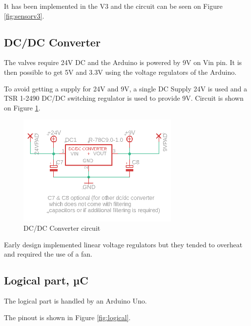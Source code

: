\documentclass[a4paper]{article}
\begin{document}
It has been implemented in the V3 and the circuit can be seen on Figure \ref{fig:sensorv3}.

\subsection{DC/DC Converter}
The valves require 24V DC and the Arduino is powered by 9V on Vin pin. It is then possible to get 5V and 3.3V using the voltage regulators of the Arduino.

To avoid getting a supply for 24V and 9V, a single DC Supply 24V is used and a TSR 1-2490 DC/DC switching regulator is used to provide 9V.
Circuit is shown on Figure \ref{fig:dcdc}.

\begin{figure}[h!]
    \centering
        \includegraphics[width = 8cm]{images/dcdcconverter.PNG}
    \caption{DC/DC Converter circuit}
    \label{fig:dcdc}
\end{figure}

Early design implemented linear voltage regulators but they tended to overheat and required the use of a fan.


\subsection{Logical part, µC}
The logical part is handled by an Arduino Uno.

The pinout is shown in Figure \ref{fig:logical}.
\end{document}

